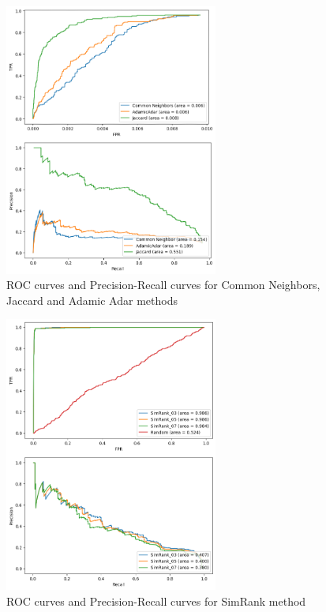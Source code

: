 \documentclass[sigchi]{acmart}
\begin{document}
\begin{figure}[H]
\centering
\includegraphics[width=7cm]{img/roc_jac3.png}
\caption{ROC curves and Precision-Recall curves for Common Neighbors, Jaccard and Adamic Adar methods}
\label{fig:roc_sup_jac}
\end{figure}

\begin{figure}[H]
\centering
\includegraphics[width=7cm]{img/roc_sim3.png}
\caption{ROC curves and Precision-Recall curves for SimRank method}
\label{fig:roc_sup_simrank}
\end{figure}
\end{document}
